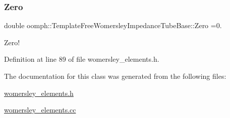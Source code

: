 \subsubsection{\texorpdfstring{Zero}{Zero}}
{\footnotesize\ttfamily double oomph\+::\+Template\+Free\+Womersley\+Impedance\+Tube\+Base\+::\+Zero =0.\hspace{0.3cm}{\ttfamily [static]}}



Zero! 



Definition at line 89 of file womersley\+\_\+elements.\+h.



The documentation for this class was generated from the following files\+:\begin{DoxyCompactItemize}
\item 
\hyperlink{womersley__elements_8h}{womersley\+\_\+elements.\+h}\item 
\hyperlink{womersley__elements_8cc}{womersley\+\_\+elements.\+cc}\end{DoxyCompactItemize}
